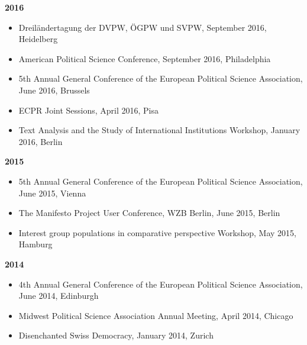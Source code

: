 \vspace{\baselineskip}

\textbf{2016}
\begin{itemize}[topsep=0pt, noitemsep, leftmargin=3]
	\item Dreiländertagung der DVPW, ÖGPW und SVPW, September 2016, Heidelberg
	\item American Political Science Conference, September 2016, Philadelphia
	\item 5th Annual General Conference of the European Political Science Association, June 2016, Brussels
	\item ECPR Joint Sessions, April 2016, Pisa
	\item Text Analysis and the Study of International Institutions Workshop, January 2016, Berlin
\end{itemize}

\vspace{\baselineskip}

\textbf{2015}
\begin{itemize}[topsep=0pt, noitemsep, leftmargin=3]
	\item 5th Annual General Conference of the European Political Science Association, June 2015, Vienna
	\item The Manifesto Project User Conference, WZB Berlin, June 2015, Berlin
	\item Interest group populations in comparative perspective Workshop, May 2015, Hamburg
\end{itemize}

\vspace{\baselineskip}

\textbf{2014}
\begin{itemize}[topsep=0pt, noitemsep, leftmargin=3]
	\item 4th Annual General Conference of the European Political Science Association, June 2014, Edinburgh
	\item Midwest Political Science Association Annual Meeting, April 2014, Chicago
	\item Disenchanted Swiss Democracy, January 2014, Zurich
\end{itemize}

\vspace{\baselineskip}

